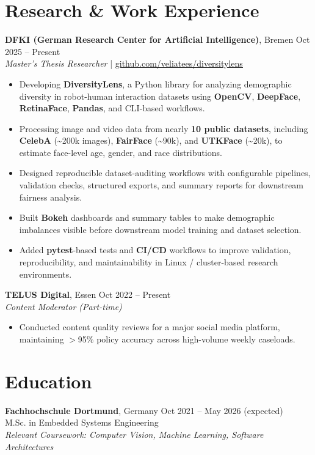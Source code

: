 \documentclass[a4paper,9.5pt]{extarticle}
\begin{document}
\section*{Research \& Work Experience}
\textbf{DFKI (German Research Center for Artificial Intelligence)}, Bremen \hfill Oct 2025 -- Present\\
\textit{Master's Thesis Researcher} \;|\; \href{https://github.com/veliatees/diversitylens}{\underline{github.com/veliatees/diversitylens}}
\begin{itemize}[leftmargin=*, itemsep=0pt, topsep=1pt, parsep=0pt]
    \item Developing \textbf{DiversityLens}, a Python library for analyzing demographic diversity in robot-human interaction datasets using \textbf{OpenCV}, \textbf{DeepFace}, \textbf{RetinaFace}, \textbf{Pandas}, and CLI-based workflows.
    \item Processing image and video data from nearly \textbf{10 public datasets}, including \textbf{CelebA} (\textasciitilde 200k images), \textbf{FairFace} (\textasciitilde 90k), and \textbf{UTKFace} (\textasciitilde 20k), to estimate face-level age, gender, and race distributions.
    \item Designed reproducible dataset-auditing workflows with configurable pipelines, validation checks, structured exports, and summary reports for downstream fairness analysis.
    \item Built \textbf{Bokeh} dashboards and summary tables to make demographic imbalances visible before downstream model training and dataset selection.
    \item Added \textbf{pytest}-based tests and \textbf{CI/CD} workflows to improve validation, reproducibility, and maintainability in Linux / cluster-based research environments.
\end{itemize}

\textbf{TELUS Digital}, Essen \hfill Oct 2022 -- Present\\
\textit{Content Moderator (Part-time)}
\begin{itemize}[leftmargin=*, itemsep=0pt, topsep=1pt, parsep=0pt]
    \item Conducted content quality reviews for a major social media platform, maintaining $>$95\% policy accuracy across high-volume weekly caseloads.
\end{itemize}

\section*{Education}
\textbf{Fachhochschule Dortmund}, Germany \hfill Oct 2021 -- May 2026 (expected)\\
M.Sc. in Embedded Systems Engineering\\
\textit{Relevant Coursework: Computer Vision, Machine Learning, Software Architectures}
\end{document}
